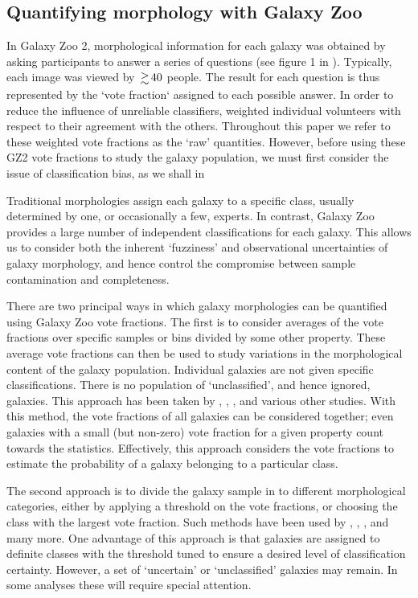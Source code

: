 \documentclass[useAMS,usenatbib]{mn2e}
\begin{document}
\subsection{Quantifying morphology with Galaxy Zoo}
\label{sec:comparison_methods}

In Galaxy Zoo 2, morphological information for each galaxy was obtained by asking participants to answer a series of questions (see figure 1 in \citealt{Willett_13}).  Typically, each image was viewed by $\ga 40$ people.  The result for each question is thus represented by the `vote fraction` assigned to each possible answer.  In order to reduce the influence of unreliable classifiers, \citet{Willett_13} weighted individual volunteers with respect to their agreement with the others.  Throughout this paper we refer to these weighted vote fractions as the `raw' quantities. However, before using these GZ2 vote fractions to study the galaxy population, we must first consider the issue of classification bias, as we shall in

Traditional morphologies assign each galaxy to a specific class, usually determined by one, or occasionally a few, experts. In contrast, Galaxy Zoo provides a large number of independent classifications for each galaxy.  This allows us to consider both the inherent `fuzziness' and observational uncertainties of galaxy morphology, and hence control the compromise between sample contamination and completeness.

There are two principal ways in which galaxy morphologies can be quantified using Galaxy Zoo vote fractions. The first is to consider averages of the vote fractions over specific samples or bins divided by some other property.  These average vote fractions can then be used to study variations in the morphological content of the galaxy population.  Individual galaxies are not given specific classifications.  There is no population of `unclassified', and hence ignored, galaxies.  This approach has been taken by \citet{Bamford_09}, \citet{Casteels_13}, \citet{Willett_15}, and various other studies. With this method, the vote fractions of all galaxies can be considered together; even galaxies with a small (but non-zero) vote fraction for a given property count towards the statistics. Effectively, this approach considers the vote fractions to estimate the probability of a galaxy belonging to a particular class.

The second approach is to divide the galaxy sample in to different morphological categories, either by applying a threshold on the vote fractions, or choosing the class with the largest vote fraction. Such methods have been used by \citet{Land_08}, \citet{Skibba_09}, \citet{Smethurst_15}, and many more.  One advantage of this approach is that galaxies are assigned to definite classes with the threshold tuned to ensure a desired level of classification certainty.  However, a set of `uncertain' or `unclassified' galaxies may remain.  In some analyses these will require special attention.
\end{document}
